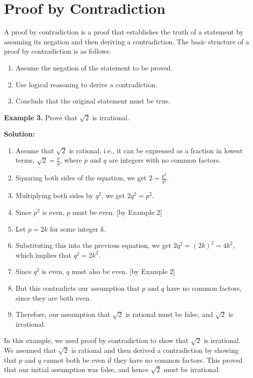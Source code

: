 \documentclass{article}
\begin{document}
\section{Proof by Contradiction}

A proof by contradiction is a proof that establishes the truth of a statement by assuming its negation and then deriving a contradiction. The basic structure of a proof by contradiction is as follows:

\begin{enumerate}
\item Assume the negation of the statement to be proved.
\item Use logical reasoning to derive a contradiction.
\item Conclude that the original statement must be true.
\end{enumerate}

\noindent\textbf{Example 3.} Prove that $\sqrt{2}$ is irrational.

\noindent\textbf{Solution:}
\begin{enumerate}
\item Assume that $\sqrt{2}$ is rational, i.e., it can be expressed as a fraction in lowest terms, $\sqrt{2}=\frac{p}{q}$, where $p$ and $q$ are integers with no common factors.
\item Squaring both sides of the equation, we get $2=\frac{p^2}{q^2}$.
\item Multiplying both sides by $q^2$, we get $2q^2=p^2$.
\item Since $p^2$ is even, $p$ must be even. [by Example 2]
\item Let $p=2k$ for some integer $k$.
\item Substituting this into the previous equation, we get $2q^2=(2k)^2=4k^2$, which implies that $q^2=2k^2$.
\item Since $q^2$ is even, $q$ must also be even. [by Example 2]
\item But this contradicts our assumption that $p$ and $q$ have no common factors, since they are both even.
\item Therefore, our assumption that $\sqrt{2}$ is rational must be false, and $\sqrt{2}$ is irrational.
\end{enumerate}

In this example, we used proof by contradiction to show that $\sqrt{2}$ is irrational. We assumed that $\sqrt{2}$ is rational and then derived a contradiction by showing that $p$ and $q$ cannot both be even if they have no common factors. This proved that our initial assumption was false, and hence $\sqrt{2}$ must be irrational.
\end{document}
